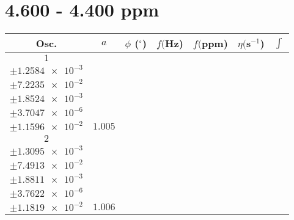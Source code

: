\documentclass[8pt]{article}
\begin{document}
\section*{4.600 - 4.400 ppm}
\begin{longtable}[l]{c c c c c c c}
\toprule
Osc. & $a$ & $\phi$ ($^{\circ}$) & $f ($Hz) & $f ($ppm) & $\eta ($s$^{-1}$) & $\int$\\
\midrule
$\num{1}$ & \begin{tabular}[c]{@{}c@{}}$\num{1.0003}$ \\ $\pm\num{1.2584e-3}$\end{tabular} & \begin{tabular}[c]{@{}c@{}}$\num{6.4781e-2}$ \\ $\pm\num{7.2235e-2}$\end{tabular} & \begin{tabular}[c]{@{}c@{}}$\num{2.2344e+3}$ \\ $\pm\num{1.8524e-3}$\end{tabular} & \begin{tabular}[c]{@{}c@{}}$\num{4.4688}$ \\ $\pm\num{3.7047e-6}$\end{tabular} & \begin{tabular}[c]{@{}c@{}}$\num{7.0095}$ \\ $\pm\num{1.1596e-2}$\end{tabular} & $\num{1.005}$\\
$\num{2}$ & \begin{tabular}[c]{@{}c@{}}$\num{1.0011}$ \\ $\pm\num{1.3095e-3}$\end{tabular} & \begin{tabular}[c]{@{}c@{}}$\num{3.4463e-2}$ \\ $\pm\num{7.4913e-2}$\end{tabular} & \begin{tabular}[c]{@{}c@{}}$\num{2.243e+3}$ \\ $\pm\num{1.8811e-3}$\end{tabular} & \begin{tabular}[c]{@{}c@{}}$\num{4.486}$ \\ $\pm\num{3.7622e-6}$\end{tabular} & \begin{tabular}[c]{@{}c@{}}$\num{7.0011}$ \\ $\pm\num{1.1819e-2}$\end{tabular} & $\num{1.006}$\\

\end{longtable}
\end{document}
